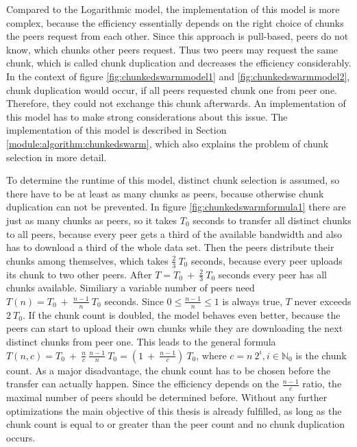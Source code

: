 Compared to the Logarithmic model, the implementation of this model is more complex, because the efficiency essentially depends on the right choice of chunks the peers request from each other. Since this approach is pull-based, peers do not know, which chunks other peers request. Thus two peers may request the same chunk, which is called chunk duplication and decreases the efficiency considerably. In the context of figure \ref{fig:chunkedswarmmodel1} and \ref{fig:chunkedswarmmodel2}, chunk duplication would occur, if all peers requested chunk one from peer one. Therefore, they could not exchange this chunk afterwards. An implementation of this model has to make strong considerations about this issue. The implementation of this model is described in Section \ref{module:algorithm:chunkedswarm}, which also explains the problem of chunk selection in more detail. 

To determine the runtime of this model, distinct chunk selection is assumed, so there have to be at least as many chunks as peers, because otherwise chunk duplication can not be prevented. In figure \ref{fig:chunkedswarmformula1} there are just as many chunks as peers, so it takes $T_0$ seconds to transfer all distinct chunks to all peers, because every peer gets a third of the available bandwidth and also has to download a third of the whole data set. Then the peers distribute their chunks among themselves, which takes $\frac{2}{3}\:T_0$ seconds, because every peer uploads its chunk to two other peers. After $T = T_0\:+\:\frac{2}{3}\:T_0$ seconds every peer has all chunks available. Similiary a variable number of peers need $T(n) = T_0\:+\:\frac{n - 1}{n}\:T_0$ seconds. Since $0 \leq \frac{n - 1}{n} \leq 1$ is always true, $T$ never exceeds $2\:T_0$. If the chunk count is doubled, the model behaves even better, because the peers can start to upload their own chunks while they are downloading the next distinct chunks from peer one. This leads to the general formula $T(n, c) = T_0\:+\:\frac{n}{c}\:\frac{n-1}{n}\:T_0 = (1\:+\:\frac{n-1}{c})\:T_0$, where $c = n\:2^i, i \in \mathbb{N}_0$ is the chunk count. As a major disadvantage, the chunk count has to be chosen before the transfer can actually happen. Since the efficiency depends on the $\frac{n-1}{c}$ ratio, the maximal number of peers should be determined before. Without any further optimizations the main objective of this thesis is already fulfilled, as long as the chunk count is equal to or greater than the peer count and no chunk duplication occurs.

